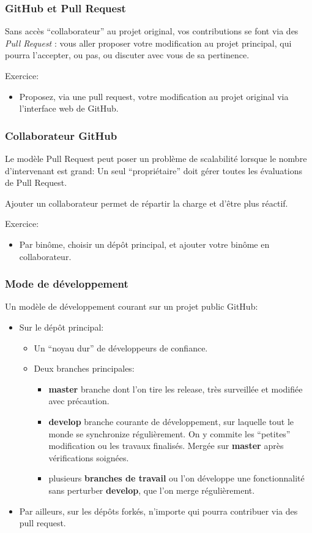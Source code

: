 \documentclass{beamer}
\begin{document}
\begin{frame}\frametitle{GitHub et Pull Request}
  Sans accès ``collaborateur'' au projet original, vos contributions se font via des {\em Pull Request} : vous aller proposer votre modification au projet principal, qui pourra l'accepter, ou pas, ou discuter avec vous de sa pertinence.

  Exercice:
  \begin{itemize}
  \item Proposez, via une pull request, votre modification au projet original via l'interface web de GitHub.
  \end{itemize}
\end{frame}

\begin{frame}\frametitle{Collaborateur GitHub}
  Le modèle Pull Request peut poser un problème de scalabilité lorsque le nombre d'intervenant est grand: Un seul ``propriétaire'' doit gérer toutes les évaluations de Pull Request.
  
  Ajouter un collaborateur permet de répartir la charge et d'être plus réactif.

  Exercice:
  \begin{itemize} 
    \item Par binôme, choisir un dépôt principal, et ajouter votre binôme en collaborateur.
  \end{itemize}
\end{frame}

\begin{frame}\frametitle{Mode de développement}
  Un modèle de développement courant sur un projet public GitHub:
  \begin{itemize}
  \item Sur le dépôt principal:
    \begin{itemize}
    \item Un ``noyau dur'' de développeurs de confiance.
    \item Deux branches principales:
      \begin{itemize}
      \item {\bf master} branche dont l'on tire les release, très surveillée et modifiée avec précaution.
      \item {\bf develop} branche courante de développement, sur laquelle tout le monde se synchronize régulièrement. On y commite les ``petites'' modification ou les travaux finalisés. 
        Mergée sur {\bf master} après vérifications soignées.
      \item plusieurs {\bf branches de travail} ou l'on développe une fonctionnalité sans perturber {\bf develop}, que l'on merge régulièrement.
      \end{itemize}
    \end{itemize}
  \item Par ailleurs, sur les dépôts forkés, n'importe qui pourra contribuer via des pull request.
  \end{itemize}
\end{frame}
\end{document}
